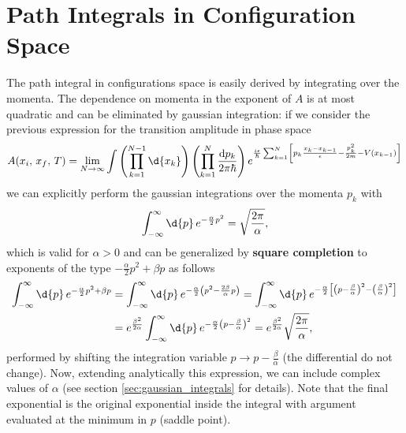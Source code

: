 \section{Path Integrals in Configuration Space}

The path integral in configurations space is easily derived by integrating over the momenta. The dependence on momenta in the exponent of \(A\) is at most quadratic and can be eliminated by gaussian integration: if we consider the previous expression for the transition amplitude in phase space
\[
    A(x_i,\,x_f,\,T) = \lim_{N \to \infty} \int \left(\prod_{k=1}^{N-1} \d{x_k}\right) \left(\prod_{k=1}^{N} \frac{\mathrm{d} p_k}{2\pi \hbar}\right)e^{\frac{i\epsilon}{\hbar}\sum_{k=1}^N \left[p_k \frac{x_k - x_{k-1}}{\epsilon} - \frac{p_k^2}{2m} - V(x_{k-1})    \right] }
\]
we can explicitly perform the gaussian integrations over the momenta \(p_k\) with
\[
    \int_{-\infty}^{\infty} \d{p} \, e^{-\frac{\alpha}{2} p^2} = \sqrt{\frac{2\pi}{\alpha}},
\]
which is valid for \(\alpha >0\) and can be generalized by \textbf{square completion} to exponents of the type \(-\frac{\alpha}{2}p^2 + \beta p\) as follows
\[
    \begin{aligned}
        \int_{-\infty}^{\infty} \d{p} \, e^{-\frac{\alpha}{2} p^2 + \beta p} & = \int_{-\infty}^{\infty} \d{p} \, e^{-\frac{\alpha}{2} \left(p^2 - \frac{2\beta}{\alpha} p\right)}  = \int_{-\infty}^{\infty} \d{p} \, e^{-\frac{\alpha}{2} \left[\left(p - \frac{\beta}{\alpha}\right)^2 - \left(\frac{\beta}{\alpha}\right)^2\right]} \\
                                                                             & = e^{\frac{\beta^2}{2\alpha}} \int_{-\infty}^{\infty} \d{p} \, e^{-\frac{\alpha}{2} \left(p - \frac{\beta}{\alpha}\right)^2} = e^{\frac{\beta^2}{2\alpha}} \sqrt{\frac{2\pi}{\alpha}},
    \end{aligned}
\]
performed by shifting the integration variable \(p \to p - \frac{\beta}{\alpha}\) (the differential do not change). Now, extending analytically this expression, we can include complex values of \(\alpha\) (see section \ref{sec:gaussian_integrals} for details). Note that the final exponential is the original exponential inside the integral with argument evaluated at the minimum in \(p\) (saddle point).

